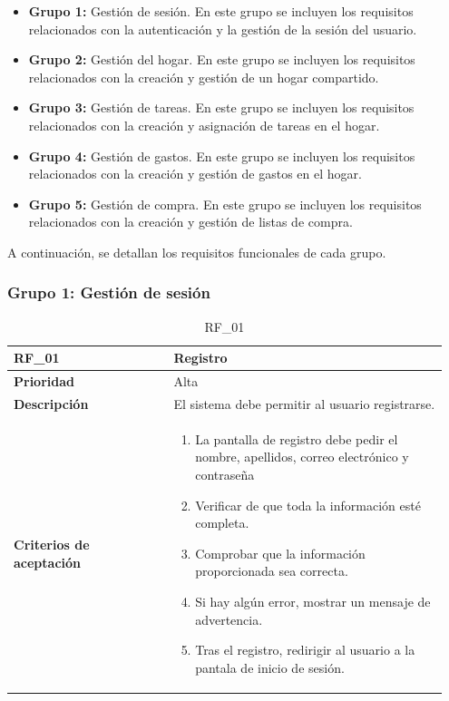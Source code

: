 \begin{itemize}
    \item \textbf{Grupo 1:} Gestión de sesión. En este grupo se incluyen los requisitos relacionados con la autenticación y la gestión de la sesión del usuario.
    \item \textbf{Grupo 2:} Gestión del hogar. En este grupo se incluyen los requisitos relacionados con la creación y gestión de un hogar compartido.
    \item \textbf{Grupo 3:} Gestión de tareas. En este grupo se incluyen los requisitos relacionados con la creación y asignación de tareas en el hogar.
    \item \textbf{Grupo 4:} Gestión de gastos. En este grupo se incluyen los requisitos relacionados con la creación y gestión de gastos en el hogar.
    \item \textbf{Grupo 5:} Gestión de compra. En este grupo se incluyen los requisitos relacionados con la creación y gestión de listas de compra.
\end{itemize}

A continuación, se detallan los requisitos funcionales de cada grupo.

\subsubsection{Grupo 1: Gestión de sesión}
\label{subsubsec:grupo1}


\begin{table}[htb!]
	\centering 
	\begin{tabular}{|p{0.35\linewidth}|p{0.6\linewidth}|}
		\hline
		\rowcolor[HTML]{C0C0C0}  
        \textbf{RF\_01} & \textbf{Registro} \\
		\hline
		\textbf{Prioridad} & Alta \\
		\hline
		\textbf{Descripción} & El sistema debe permitir al usuario registrarse.  \\
		\hline
		\vspace{0.5mm}
		\textbf{Criterios de aceptación} & 
		\begin{minipage}[t]{0.9\linewidth}
			\begin{enumerate}
                \item La pantalla de registro debe pedir el nombre, apellidos, correo electrónico y contraseña
                \item Verificar de que toda la información esté completa.
                \item Comprobar que la información proporcionada sea correcta.
                \item Si hay algún error, mostrar un mensaje de advertencia.
                \item Tras el registro, redirigir al usuario a la pantala de inicio de sesión.
			\end{enumerate}
			\vspace{2mm}
		\end{minipage} \\
		\hline
	\end{tabular}
	\caption{RF\_01}
    \label{req:RF01}
\end{table}

